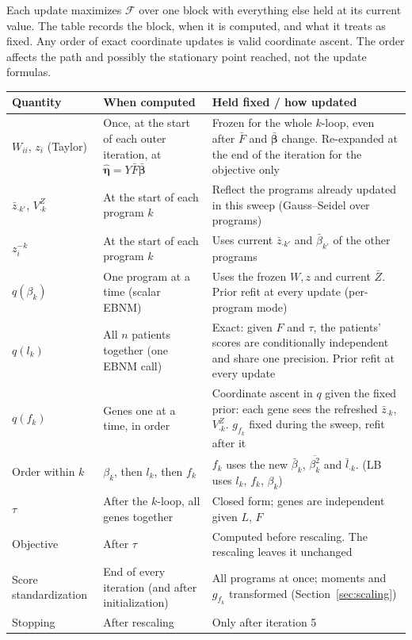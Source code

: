 \documentclass[11pt]{article}
\newcommand{\betabar}[1]{\bar{\beta}_{#1}}
\newcommand{\betasec}[1]{\overline{\beta^2_{#1}}}
\begin{document}
Each update maximizes $\mathcal F$ over one block with everything else held at
its current value. The table records the block, when it is computed, and what
it treats as fixed. Any order of exact coordinate updates is valid coordinate
ascent. The order affects the path and possibly the stationary point reached,
not the update formulas.

\begin{center}
\begin{tabularx}{\textwidth}{>{\raggedright\arraybackslash}p{3.0cm}>{\raggedright\arraybackslash}p{3.6cm}>{\raggedright\arraybackslash}X}
\toprule
Quantity & When computed & Held fixed / how updated \\
\midrule
$W_{ii}$, $z_i$ (Taylor) & Once, at the start of each outer iteration, at $\hat{\bm\eta} = Y\bar F\bar{\bm\beta}$ & Frozen for the whole $k$-loop, even after $\bar F$ and $\bar{\bm\beta}$ change. Re-expanded at the end of the iteration for the objective only \\
$\bar z_{\cdot k'}$, $V^Z_{\cdot k}$ & At the start of each program $k$ & Reflect the programs already updated in this sweep (Gauss--Seidel over programs) \\
$z^{-k}_i$ & At the start of each program $k$ & Uses current $\bar z_{\cdot k'}$ and $\betabar{k'}$ of the other programs \\
$q(\beta_k)$ & One program at a time (scalar EBNM) & Uses the frozen $W, z$ and current $\bar Z$. Prior refit at every update (per-program mode) \\
$q(l_k)$ & All $n$ patients together (one EBNM call) & Exact: given $F$ and $\tau$, the patients' scores are conditionally independent and share one precision. Prior refit at every update \\
$q(f_k)$ & Genes one at a time, in order & Coordinate ascent in $q$ given the fixed prior: each gene sees the refreshed $\bar z_{\cdot k}$, $V^Z_{\cdot k}$. $g_{f_k}$ fixed during the sweep, refit after it \\
Order within $k$ & $\beta_k$, then $l_k$, then $f_k$ & $f_k$ uses the new $\betabar{k}$, $\betasec{k}$ and $\bar l_{\cdot k}$. (LB uses $l_k$, $f_k$, $\beta_k$) \\
$\tau$ & After the $k$-loop, all genes together & Closed form; genes are independent given $L$, $F$ \\
Objective & After $\tau$ & Computed before rescaling. The rescaling leaves it unchanged \\
Score standardization & End of every iteration (and after initialization) & All programs at once; moments and $g_{f_k}$ transformed (Section~\ref{sec:scaling}) \\
Stopping & After rescaling & Only after iteration 5 \\
\bottomrule
\end{tabularx}
\end{center}
\end{document}
